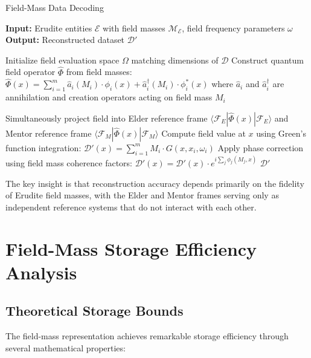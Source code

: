 \begin{algorithm}[h]
\caption{Field-Mass Data Decoding}
\begin{algorithmic}[1]
\State \textbf{Input:} Erudite entities $\mathcal{E}$ with field masses $\mathcal{M}_{\mathcal{E}}$, field frequency parameters $\omega$
\State \textbf{Output:} Reconstructed dataset $\mathcal{D'}$

\State Initialize field evaluation space $\Omega$ matching dimensions of $\mathcal{D}$
\State Construct quantum field operator $\hat{\Phi}$ from field masses:
\State \hspace{1em} $\hat{\Phi}(x) = \sum_{i=1}^m \hat{a}_i(M_i) \cdot \phi_i(x) + \hat{a}_i^\dagger(M_i) \cdot \phi_i^*(x)$
\State where $\hat{a}_i$ and $\hat{a}_i^\dagger$ are annihilation and creation operators acting on field mass $M_i$

  \State Simultaneously project field into Elder reference frame $\langle \mathcal{F}_E | \hat{\Phi}(x) | \mathcal{F}_E \rangle$
  \State and Mentor reference frame $\langle \mathcal{F}_M | \hat{\Phi}(x) | \mathcal{F}_M \rangle$
  \State Compute field value at $x$ using Green's function integration:
  \State \hspace{1em} $\mathcal{D'}(x) = \sum_{i=1}^m M_i \cdot G(x, x_i, \omega_i)$
  \State Apply phase correction using field mass coherence factors:
  \State \hspace{1em} $\mathcal{D'}(x) = \mathcal{D'}(x) \cdot e^{i\sum_j \phi_j(M_j,x)}$
\EndFor
\State \Return $\mathcal{D'}$
\end{algorithmic}
\end{algorithm}

The key insight is that reconstruction accuracy depends primarily on the fidelity of Erudite field masses, with the Elder and Mentor frames serving only as independent reference systems that do not interact with each other.

\section{Field-Mass Storage Efficiency Analysis}

\subsection{Theoretical Storage Bounds}

The field-mass representation achieves remarkable storage efficiency through several mathematical properties:

